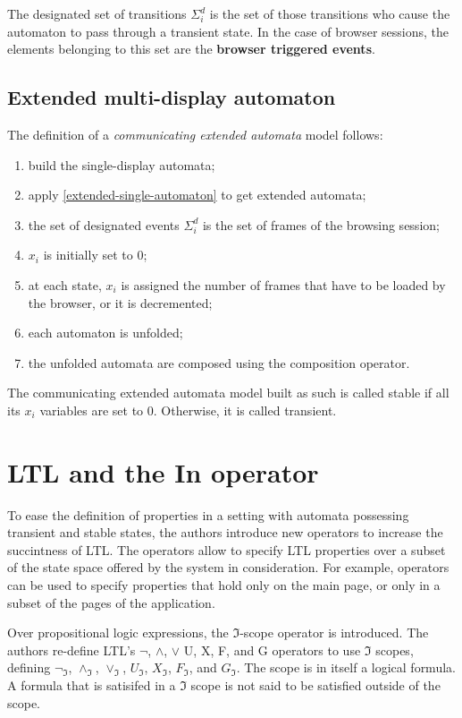 \documentclass[a4paper,10pt]{article}
\theoremstyle{plain} %
\theoremstyle{definition}
\theoremstyle{remark}
\begin{document}
The designated set of transitions $\Sigma^d_i$ is the set of those transitions who cause the automaton to pass through a transient state. In the case of browser sessions, the elements belonging to this set are the \textbf{browser triggered events}.

\subsection{Extended multi-display automaton}

The definition of a \textit{communicating extended automata} model follows:

\begin{enumerate}
  \item build the single-display automata;
  \item apply \cref{extended-single-automaton} to get extended automata;
  \item the set of designated events $\Sigma^d_i$ is the set of frames of the browsing session;
  \item $x_i$ is initially set to 0;
  \item at each state, $x_i$ is assigned the number of frames that have to be loaded by the browser, or it is decremented;
  \item each automaton is unfolded; %
  \item the unfolded automata are composed using the composition operator.
\end{enumerate}

The communicating extended automata model built as such is called stable if all its $x_i$ variables are set to 0. Otherwise, it is called transient.

\section{LTL and the In operator}

To ease the definition of properties in a setting with automata possessing transient and stable states, the authors introduce new operators to increase the succintness of LTL. The operators allow to specify LTL properties over a subset of the state space offered by the system in consideration. For example, operators can be used to specify properties that hold only on the main page, or only in a subset of the pages of the application.

Over propositional logic expressions, the $\mathcal{\Im}$-scope operator is introduced. The authors re-define LTL's $\neg$, $\land$, $\lor$ U, X, F, and G operators to use $\mathcal{\Im}$ scopes, defining $\neg_{\mathcal{\Im}}$, $\land_{\mathcal{\Im}}$, $\lor_{\mathcal{\Im}}$, $U_{\mathcal{\Im}}$, $X_{\mathcal{\Im}}$, $F_{\mathcal{\Im}}$, and $G_{\mathcal{\Im}}$. The scope is in itself a logical formula. A formula that is satisifed in a $\Im$ scope is not said to be satisfied outside of the scope.
\end{document}
